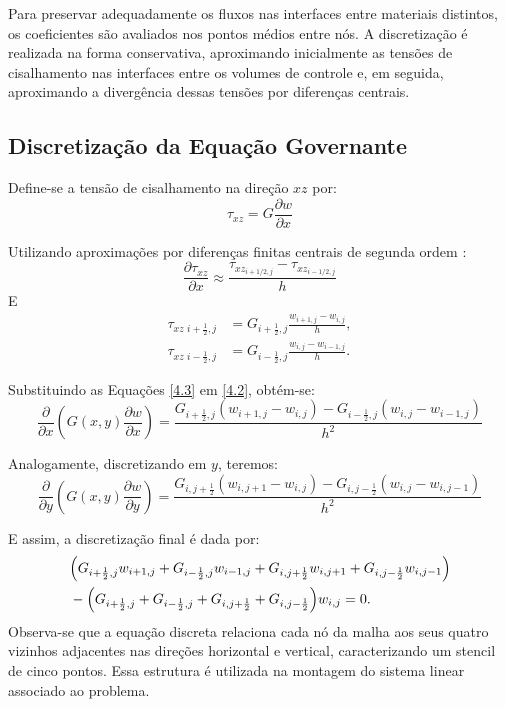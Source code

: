 \documentclass[brazil]{TCAM} %
\begin{document}
Para preservar adequadamente os fluxos nas interfaces entre materiais distintos, os coeficientes são avaliados nos pontos médios entre nós.
A discretização é realizada na forma conservativa, aproximando inicialmente as tensões de cisalhamento nas interfaces entre os volumes de controle e, em seguida, aproximando a divergência dessas tensões por diferenças centrais.

\subsection{Discretização da Equação Governante}
Define-se a tensão de cisalhamento na direção $xz$ por:
\begin{equation}
     \tau_{xz}=G\dfrac{\partial w}{\partial x}
\label{4.2}
\end{equation}

Utilizando aproximações por diferenças finitas centrais de segunda ordem \cite{leveque2007}:
$$
\frac{\partial \tau_{xz}}{\partial x} \approx \dfrac{\tau_{xz_{i+1/2,j}} - \tau_{xz_{i-1/2,j}}}{h}
$$
E
\begin{equation}
\begin{aligned}
\tau_{xz\,\,i+\frac12,j}
&=
G_{i+\frac12,j}
\frac{w_{i+1,j}-w_{i,j}}{h},
\\[2mm]
\tau_{xz\,\,i-\frac12,j}
&=
G_{i-\frac12,j}
\frac{w_{i,j}-w_{i-1,j}}{h}.
\end{aligned}
\label{4.3}
\end{equation}

Substituindo as Equações \eqref{4.3} em \eqref{4.2}, obtém-se:
\begin{equation}
    \frac{\partial}{\partial x}
\left(
G(x,y) \frac{\partial w}{\partial x}
\right) = \frac{G_{i+\frac12,j}
{(w_{i+1,j}-w_{i,j})} - G_{i-\frac12,j}
(w_{i,j}-w_{i-1,j})}{h^2}
\end{equation}

Analogamente, discretizando em $y$, teremos:
\begin{equation*}
    \frac{\partial}{\partial y}
\left(
G(x,y) \frac{\partial w}{\partial y}
\right) = \frac{G_{i,j+\frac12}
{(w_{i,j+1}-w_{i,j})} - G_{i,j-\frac12}
(w_{i,j}-w_{i,j-1})}{h^2}
\end{equation*}

E assim, a discretização final é dada por:
\begin{equation*}
\begin{aligned}
&\Bigl(
G_{i+\frac{1}{2},j}w_{i+1,j}
+G_{i-\frac{1}{2},j}w_{i-1,j}
+G_{i,j+\frac{1}{2}}w_{i,j+1}
+G_{i,j-\frac{1}{2}}w_{i,j-1}
\Bigr) \\
&-
\Bigl(
G_{i+\frac{1}{2},j}
+G_{i-\frac{1}{2},j}
+G_{i,j+\frac{1}{2}}
+G_{i,j-\frac{1}{2}}
\Bigr)w_{i,j}
=0.
\end{aligned}
\end{equation*}
Observa-se que a equação discreta relaciona cada nó da malha aos seus
quatro vizinhos adjacentes nas direções horizontal e vertical,
caracterizando um stencil de cinco pontos. Essa estrutura é utilizada na
montagem do sistema linear associado ao problema.
\end{document}
